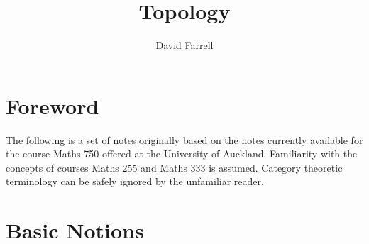 \documentclass{book}
\title{Topology}
\author{David Farrell}
\theoremstyle{definition}
\theoremstyle{remark}
\begin{document}
\maketitle

\frontmatter
\chapter{Foreword}
The following is a set of notes originally based on the notes currently available for the course Maths 750 offered at the University of Auckland. Familiarity with the concepts of courses Maths 255 and Maths 333 is assumed. Category theoretic terminology can be safely ignored by the unfamiliar reader.
\mainmatter

\tableofcontents

\chapter{Basic Notions}
\end{document}
